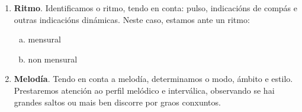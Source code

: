 \begin{multicols}{2}

%
%
%
%
%
%
%
    \begin{enumerate}[1.-]
        \item %
        \textbf{Ritmo}. Identificamos o ritmo, tendo en conta: pulso, indicacións de compás e outras indicacións dinámicas. 
        Neste caso, estamos ante un ritmo:
        \begin{enumerate}[a)]
            \item mensural 
            \item non mensural 
        \end{enumerate}
        \item %
        \textbf{Melodía}. Tendo en conta a melodía, determinamos o modo, ámbito e estilo. Prestaremos atención ao perfil melódico e interválica, observando se hai grandes saltos ou mais ben discorre por graos conxuntos.

\end{enumerate}
\end{multicols}
